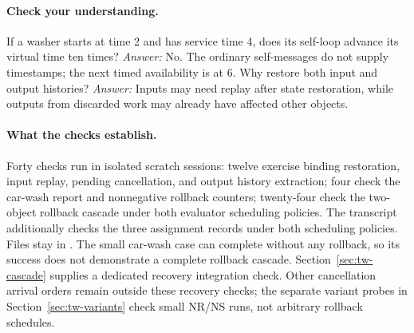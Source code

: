 

\paragraph{Check your understanding.}
If a washer starts at time 2 and has service time 4, does its self-loop
advance its virtual time ten times?
\emph{Answer:} No. The ordinary self-messages do not supply timestamps;
the next timed availability is at 6.
Why restore both input and output histories?
\emph{Answer:} Inputs may need replay after state restoration, while
outputs from discarded work may already have affected other objects.

\paragraph{What the checks establish.}
Forty checks run in isolated scratch sessions: twelve exercise
binding restoration, input replay, pending cancellation, and output
history extraction; four check the car-wash report and nonnegative
rollback counters; twenty-four check the two-object rollback cascade
under both evaluator scheduling policies. The transcript additionally checks the three
assignment records under both scheduling policies.
Files stay in .
The small car-wash case can complete without any rollback, so its
success does not demonstrate a complete rollback cascade.
Section~\ref{sec:tw-cascade} supplies a dedicated recovery integration
check. Other cancellation arrival orders remain outside these recovery
checks; the separate variant probes in Section~\ref{sec:tw-variants}
check small NR/NS runs, not arbitrary rollback schedules.
